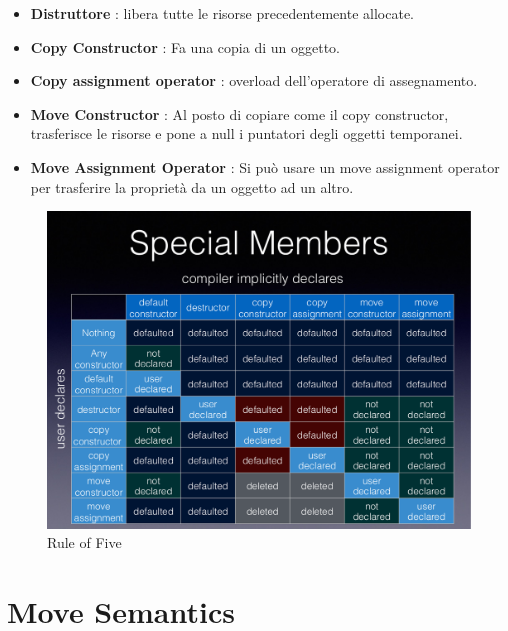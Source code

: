 \begin{itemize}
	\item \textsf{\small \textbf{Distruttore} : libera tutte le risorse precedentemente allocate.}
	\item \textsf{\small \textbf{Copy Constructor} : Fa una copia di un oggetto.}
	\item \textsf{\small \textbf{Copy assignment operator} : overload dell'operatore di assegnamento.}
	\item \textsf{\small \textbf{Move Constructor} : Al posto di copiare come il copy constructor, trasferisce le risorse e pone a null i puntatori degli oggetti temporanei.}
	\item \textsf{\small \textbf{Move Assignment Operator} : Si può usare un move assignment operator per trasferire la proprietà da un oggetto ad un altro.}
\end{itemize}

\begin{figure}[ht]
	\centering
	\includegraphics[width=1\textwidth, height=1\textheight, keepaspectratio]{./imgs/rule_of_five.png}
	\caption{Rule of Five}
	\label{fig:rule_of_five}
\end{figure}



\section{Move Semantics}


